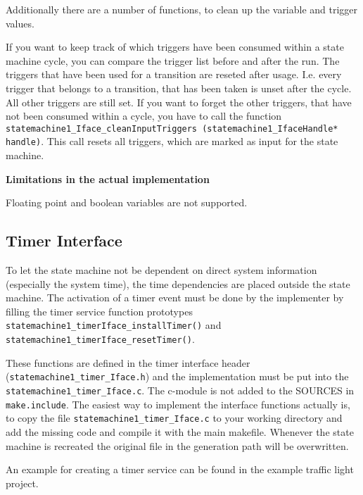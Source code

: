 Additionally there are a number of functions, to clean up the variable and
trigger values.

If you want to keep track of which triggers have been consumed within a state
machine cycle, you can compare the trigger list before and after the run. The
triggers that have been used for a transition are reseted after usage. I.e. every
trigger that belongs to a transition, that has been taken is unset after the
cycle. All other triggers are still set. If you want to forget the other
triggers, that have not been consumed within a cycle, you have to call the
function \texttt{statemachine1\_Iface\_cleanInputTriggers
(statemachine1\_IfaceHandle* handle)}. This call resets all triggers, which are
marked as input for the state machine.

\textbf{Limitations in the actual implementation}

Floating point and boolean variables are not supported.

\subsection{Timer Interface}

To let the state machine not be dependent on direct system information
(especially the system time), the time dependencies are placed outside the state
machine. The activation of a timer event must be done by the implementer by
filling the timer service function prototypes
\texttt{statemachine1\_\-timer\-Iface\_\-installTimer()} and
\texttt{statemachine1\_timer\-Iface\_\-reset\-Timer()}.

These functions are defined in the timer interface header
(\texttt{statemachine1\_timer\_Iface.h}) and the implementation must be put into
the \texttt{statemachine1\_timer\_Iface.c}. The c-module is not added to the
SOURCES in \texttt{make.include}. The easiest way to implement the interface
functions actually is, to copy the file \texttt{statemachine1\_timer\_Iface.c} to
your working directory and add the missing code and compile it with the main
makefile. Whenever the state machine is recreated the original file in the
generation path will be overwritten.

An example for creating a timer service can be found in the example traffic light
project.


